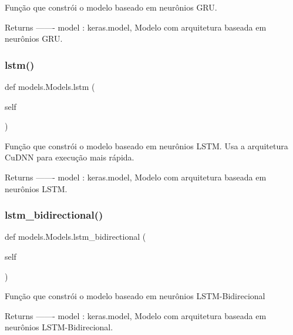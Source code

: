 \begin{DoxyVerb}Função que constrói o modelo baseado em neurônios GRU.

Returns
-------
model : keras.model,
    Modelo com arquitetura baseada em neurônios GRU.\end{DoxyVerb}
 \mbox{\label{classmodels_1_1Models_a2cb0bdd9f6937643d149f60a2c02b667}} 
\subsubsection{\texorpdfstring{lstm()}{lstm()}}
{\footnotesize\ttfamily def models.\+Models.\+lstm (\begin{DoxyParamCaption}\item[{}]{self }\end{DoxyParamCaption})}

\begin{DoxyVerb}Função que constrói o modelo baseado em neurônios LSTM.
Usa a arquitetura CuDNN para execução mais rápida.

       Returns
       -------
       model : keras.model,
   Modelo com arquitetura baseada em neurônios LSTM.\end{DoxyVerb}
 \mbox{\label{classmodels_1_1Models_ae53538a386b08e112d6a7b82ec27eb09}} 
\subsubsection{\texorpdfstring{lstm\+\_\+bidirectional()}{lstm\_bidirectional()}}
{\footnotesize\ttfamily def models.\+Models.\+lstm\+\_\+bidirectional (\begin{DoxyParamCaption}\item[{}]{self }\end{DoxyParamCaption})}

\begin{DoxyVerb}Função que constrói o modelo baseado em neurônios LSTM-Bidirecional

Returns
-------
model : keras.model,
    Modelo com arquitetura baseada em neurônios LSTM-Bidirecional.\end{DoxyVerb}
 \mbox{\label{classmodels_1_1Models_a4c0aa722dfc125b749594382b8547f2f}} 
